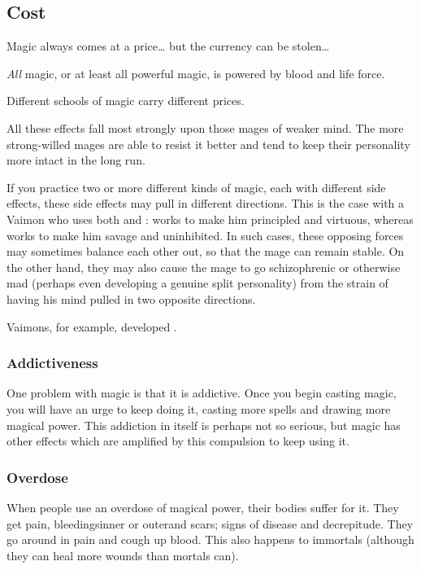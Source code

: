 \subsection{Cost}
Magic always comes at a price\ldots{} but the currency can be stolen\ldots{}

\emph{All} magic, or at least all powerful magic, is powered by blood and life force. 

Different schools of magic carry different prices.

All these effects fall most strongly upon those mages of weaker mind. The more strong-willed mages are able to resist it better and tend to keep their personality more intact in the long run. 

If you practice two or more different kinds of magic, each with different side effects, these side effects may pull in different directions. This is the case with a Vaimon who uses both \iquin and \itzach: \iquin works to make him principled and virtuous, whereas \itzach works to make him savage and uninhibited. In such cases, these opposing forces may sometimes balance each other out, so that the mage can remain stable. On the other hand, they may also cause the mage to go schizophrenic or otherwise mad (perhaps even developing a genuine split personality) from the strain of having his mind pulled in two opposite directions. 

Vaimons, for example, developed . 






\subsubsection{Addictiveness}
One problem with magic is that it is addictive. Once you begin casting magic, you will have an urge to keep doing it, casting more spells and drawing more magical power. This addiction in itself is perhaps not so serious, but magic has other effects which are amplified by this compulsion to keep using it. 





\subsubsection{Overdose}
When people use an overdose of magical power, their bodies suffer for it.
They get pain, bleedings\dash{}inner or outer\dash{}and scars; signs of disease and decrepitude.
They go around in pain and cough up blood.
This also happens to immortals (although they can heal more wounds than mortals can).

